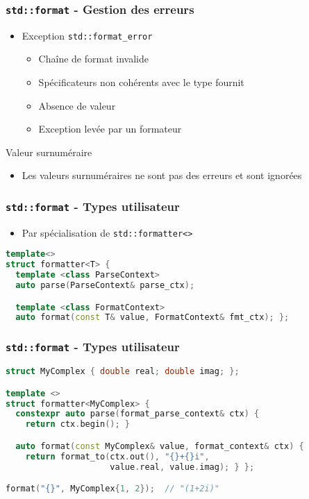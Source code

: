 \documentclass[C++.tex]{subfiles}
\begin{document}
\begin{frame}[fragile]
	\frametitle{\lstinline|std::format| - Gestion des erreurs}
	\begin{itemize}
		\item Exception \lstinline|std::format_error|
		\begin{itemize}
			\item Chaîne de format invalide
			\item Spécificateurs non cohérents avec le type fournit
			\item Absence de valeur
			\item Exception levée par un formateur
		\end{itemize}
	\end{itemize}

	\begin{block}{Valeur surnuméraire}
		\begin{itemize}
			\item Les valeurs surnuméraires ne sont pas des erreurs et sont ignorées
		\end{itemize}
	\end{block}
\end{frame}

\begin{frame}[fragile]
	\frametitle{\lstinline|std::format| - Types utilisateur}
	\begin{itemize}
		\item Par spécialisation de \lstinline|std::formatter<>|
	\end{itemize}

	\begin{lstlisting}[language=C++]
template<>
struct formatter<T> {
  template <class ParseContext>
  auto parse(ParseContext& parse_ctx);

  template <class FormatContext>
  auto format(const T& value, FormatContext& fmt_ctx); };\end{lstlisting}
\end{frame}

\begin{frame}[fragile]
	\frametitle{\lstinline|std::format| - Types utilisateur}
	\begin{lstlisting}[language=C++]
struct MyComplex { double real; double imag; };

template <>
struct formatter<MyComplex> {
  constexpr auto parse(format_parse_context& ctx) {
    return ctx.begin(); }

  auto format(const MyComplex& value, format_context& ctx) {
    return format_to(ctx.out(), "{}+{}i", 
                     value.real, value.imag); } };

format("{}", MyComplex{1, 2});	// "(1+2i)"\end{lstlisting}
\end{frame}
\end{document}
